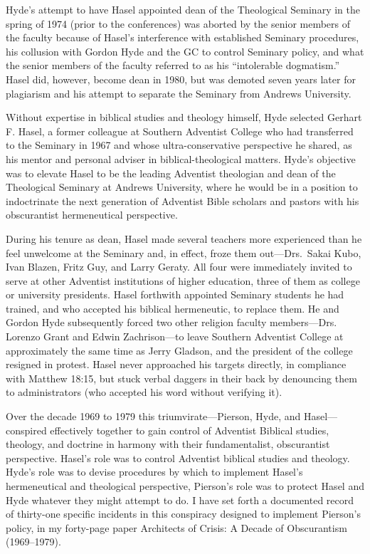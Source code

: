 Hyde's attempt to have Hasel appointed dean of the Theological Seminary in
the spring of 1974 (prior to the conferences) was aborted by the senior
members of the faculty because of Hasel's interference with established
Seminary procedures, his collusion with Gordon Hyde and the GC to control
Seminary policy, and what the senior members of the faculty referred to as
his ``intolerable
dogmatism.'' Hasel did, however, become dean in 1980, but
was demoted seven years later for plagiarism and his attempt to separate the
Seminary from Andrews University.

Without expertise in biblical studies and theology himself, Hyde selected
Gerhart F. Hasel, a former colleague at Southern Adventist College who had
transferred to the Seminary in 1967 and whose ultra-conservative perspective
he shared, as his mentor and personal adviser in biblical-theological
matters. Hyde's objective was to elevate Hasel to be the leading Adventist
theologian and dean of the Theological Seminary at Andrews University, where
he would be in a position to indoctrinate the next generation of Adventist
Bible scholars and pastors with his obscurantist hermeneutical perspective.

During his tenure as dean, Hasel made several teachers more experienced than
he feel unwelcome at the Seminary and, in effect, froze them out---Drs.\
Sakai Kubo, Ivan Blazen, Fritz Guy, and Larry Geraty. All four were
immediately invited to serve at other Adventist institutions of higher
education, three of them as college or university presidents. Hasel
forthwith appointed Seminary students he had trained, and who accepted his
biblical hermeneutic, to replace them. He and Gordon Hyde subsequently
forced two other religion faculty members---Drs. Lorenzo Grant and Edwin
Zachrison---to leave Southern Adventist College at approximately the same
time as Jerry Gladson, and the president of the college resigned in protest.
Hasel never approached his targets directly, in compliance with Matthew
18:15, but stuck verbal daggers in their back by denouncing them to
administrators (who accepted his word without verifying it).

Over the decade 1969 to 1979 this triumvirate---Pierson, Hyde, and
Hasel---conspired effectively together to gain control of Adventist Biblical
studies, theology, and doctrine in harmony with their fundamentalist,
obscurantist perspective.\sidenote{See chapter~\nameref{ch:flaws}} Hasel's 
role was to control Adventist biblical
studies and theology. Hyde's role was to devise procedures by which to
implement Hasel's hermeneutical and theological perspective, Pierson's role
was to protect Hasel and Hyde whatever they might attempt to do. I have set
forth a documented record of thirty-one specific incidents in this
conspiracy designed to implement Pierson's policy, in my forty-page paper
Architects of Crisis: A Decade of Obscurantism (1969--1979).

